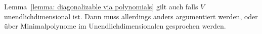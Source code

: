 \begin{remark}
  Lemma~\ref{lemma: diagonalizable via polynomials} gilt auch falls $V$ unendlichdimensional ist.
  Dann muss allerdings anders argumentiert werden, oder über Minimalpolynome im Unendlichdimensionalen gesprochen werden.
\end{remark}







